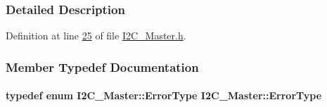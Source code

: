 \subsubsection{Detailed Description}


Definition at line \hyperlink{_i2_c___master_8h_source_l00025}{25} of file \hyperlink{_i2_c___master_8h_source}{I2C\_\-Master.h}.



\subsubsection{Member Typedef Documentation}
\hypertarget{class_i2_c___master_aed59fe6f37714506a02ec94ba3895fe0}{
\paragraph[{ErrorType}]{\setlength{\rightskip}{0pt plus 5cm}typedef enum {\bf I2C\_\-Master::ErrorType}  {\bf I2C\_\-Master::ErrorType}}\hfill}
\label{class_i2_c___master_aed59fe6f37714506a02ec94ba3895fe0}


